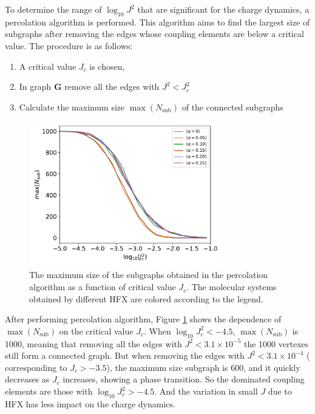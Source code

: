 \documentclass[letterpaper,12pt]{article}
\begin{document}
To determine the range of $\log_{10} J^2$ that are significant for the charge dynamics, a percolation algorithm is performed. This algorithm aims to find the largest size of subgraphs after removing the edges whose coupling elements are below a critical value. The procedure is as follows:
\begin{enumerate}
    \item A critical value $J_c$ is chosen,
    \item In graph $\mathbf{G}$ remove all the edges with $J^2 < J_c^2$
    \item Calculate the maximum size $\max({N_\text{sub}})$ of the connected subgraphs
\end{enumerate}

\begin{figure}[H]
    \centering
    \includegraphics[width=0.75\textwidth]{figs/fig_network_all.pdf}
    \caption{The maximum size of the subgraphs obtained in the percolation algorithm as a function of critical value $J_c$. The molecular systems obtained by different HFX are colored according to the legend.}
    \label{fig:J_percolate}
\end{figure}
After performing percolation algorithm, Figure \ref{fig:J_percolate} shows the dependence of $\max({N_\text{sub}})$ on the critical value $J_c$. When $\log_{10} J_c^2 < -4.5$, $\max({N_\text{sub}})$ is 1000, meaning that removing all the edges with $J^2 < 3.1 \times 10^{-5}$ the 1000 vertexes still form a connected graph. 
But when removing the edges with $J^2 < 3.1 \times 10^{-4}$ ( corresponding to $J_c > -3.5$), the maximum size subgraph is 600, and it quickly decreases as $J_c$ increases, showing a phase transition. 
So the dominated coupling elements are those with $\log_{10} J_c^2 > -4.5$. 
And the variation in small $J$ due to HFX has less impact on the charge dynamics. 
\end{document}
